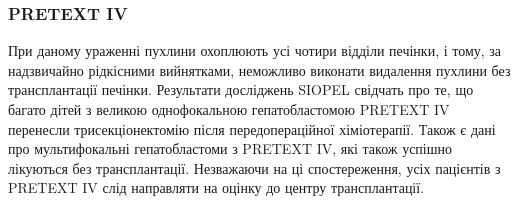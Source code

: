 \subsubsection{PRETEXT IV}
При даному ураженні пухлини охоплюють усі чотири відділи печінки, і тому, за надзвичайно рідкісними вийнятками, неможливо виконати видалення пухлини без трансплантації печінки. Результати досліджень SIOPEL свідчать про те, що багато дітей з великою однофокальною гепатобластомою PRETEXT IV перенесли трисекціонектомію після передопераційної хіміотерапії. Також є дані про мультифокальні гепатобластоми з PRETEXT IV, які також успішно лікуються без трансплантації. Незважаючи на ці спостереження, усіх пацієнтів з PRETEXT IV слід направляти на оцінку до центру трансплантації.

\begin{table}[]
\caption{Субкласифікація PRETEXT}
\label{table:subPRETEXT}
\centering
{}
\end{table}



